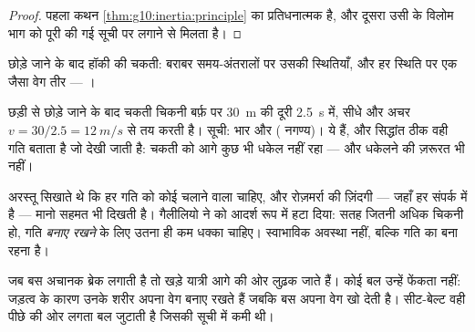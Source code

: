 \begin{proof}
पहला कथन \cref{thm:g10:inertia:principle} का प्रतिधनात्मक है, और दूसरा उसी के विलोम भाग को पूरी की
गई सूची पर लगाने से मिलता है।
\end{proof}

\begin{omfigure}

{\small छोड़े जाने के बाद हॉकी की चकती: बराबर समय-अंतरालों पर उसकी
स्थितियाँ, और हर स्थिति पर एक जैसा वेग तीर --- ।}
\end{omfigure}

\begin{example}[हॉकी की चकती]\label{ex:g10:inertia:puck}
छड़ी से छोड़े जाने के बाद चकती चिकनी बर्फ़ पर \qty{30}{m} की दूरी \qty{2.5}{s} में,
सीधे और अचर $v = 30/2.5 = \qty{12}{m/s}$ से तय करती है। सूची: भार और  ( नगण्य)। ये  हैं, और
सिद्धांत ठीक वही गति बताता है जो देखी जाती है: चकती को आगे कुछ भी धकेल
नहीं रहा --- और धकेलने की ज़रूरत भी नहीं।
\end{example}

\begin{remark}[अरस्तू के विरुद्ध गैलीलियो]
अरस्तू सिखाते थे कि हर गति को कोई चलाने वाला चाहिए, और रोज़मर्रा की
ज़िंदगी --- जहाँ हर संपर्क में  है --- मानो सहमत भी दिखती
है। गैलीलियो ने  को आदर्श रूप में हटा दिया: सतह जितनी अधिक
चिकनी हो, गति \emph{बनाए रखने} के लिए उतना ही कम धक्का चाहिए। स्वाभाविक
अवस्था  नहीं, बल्कि गति का बना रहना है।
\end{remark}

\begin{remark}[झटका खाता यात्री]
जब बस अचानक ब्रेक लगाती है तो खड़े यात्री आगे की ओर लुढ़क जाते हैं। कोई
बल उन्हें फेंकता नहीं: जड़त्व के कारण उनके शरीर अपना वेग बनाए
रखते हैं जबकि बस अपना वेग खो देती है। सीट-बेल्ट वही पीछे की ओर लगता
बल जुटाती है जिसकी सूची में कमी थी।
\end{remark}

